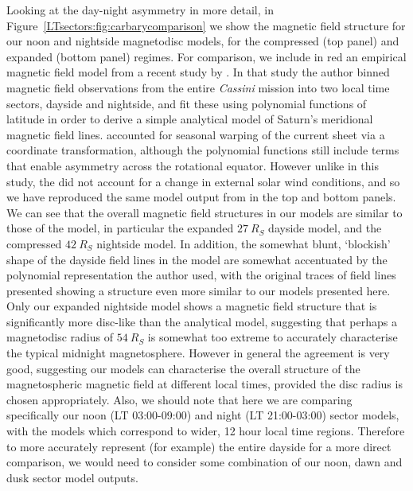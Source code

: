 Looking at the day-night asymmetry in more detail, in Figure~\ref{LTsectors:fig:carbarycomparison} we show the magnetic field structure for our noon and nightside magnetodisc models, for the compressed (top panel) and expanded (bottom panel) regimes. For comparison, we include in red an empirical magnetic field model from a recent study by \citet{carbary2018}. In that study the author binned magnetic field observations from the entire \textit{Cassini} mission into two local time sectors, dayside and nightside, and fit these using polynomial functions of latitude in order to derive a simple analytical model of Saturn's meridional magnetic field lines. \citet{carbary2018} accounted for seasonal warping of the current sheet via a coordinate transformation, although the polynomial functions still include terms that enable asymmetry across the rotational equator. However unlike in this study, the \citet{carbary2018} did not account for a change in external solar wind conditions, and so we have reproduced the same model output from \citet{carbary2018} in the top and bottom panels. We can see that the overall magnetic field structures in our models are similar to those of the \citet{carbary2018} model, in particular the expanded $\SI{27}{R_S}$ dayside model, and the compressed $\SI{42}{R_S}$ nightside model. In addition, the somewhat blunt, `blockish' shape of the dayside field lines in the \citet{carbary2018} model are somewhat accentuated by the polynomial representation the author used, with the original traces of field lines presented showing a structure even more similar to our models presented here. Only our expanded nightside model shows a magnetic field structure that is significantly more disc-like than the \citet{carbary2018} analytical model, suggesting that perhaps a magnetodisc radius of $\SI{54}{R_S}$ is somewhat too extreme to accurately characterise the typical midnight magnetosphere. However in general the agreement is very good, suggesting our models can characterise the overall structure of the magnetospheric magnetic field at different local times, provided the disc radius is chosen appropriately. Also, we should note that here we are comparing specifically our noon (LT 03:00-09:00) and night (LT 21:00-03:00) sector models, with the \citet{carbary2018} models which correspond to wider, 12 hour local time regions. Therefore to more accurately represent (for example) the entire dayside for a more direct comparison, we would need to consider some combination of our noon, dawn and dusk sector model outputs.

